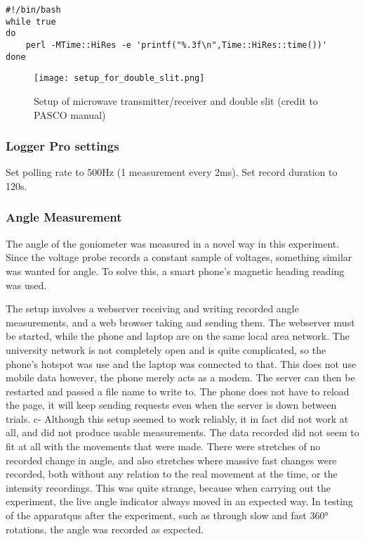 \begin{verbatim}
#!/bin/bash
while true
do
    perl -MTime::HiRes -e 'printf("%.3f\n",Time::HiRes::time())'
done
\end{verbatim}

\begin{figure}[h]
\centering
\texttt{[image: setup\_for\_double\_slit.png]}
\caption{Setup of microwave transmitter/receiver and double slit (credit to PASCO manual)}

\label{fig:goniometer_and_microwaves}
\end{figure}

\subsubsection*{Logger Pro settings}
Set polling rate to 500Hz (1 measurement every 2ms). Set record duration to 120s.

\subsubsection*{Angle Measurement}

The angle of the goniometer was measured in a novel way in this experiment. Since the voltage probe records a constant sample of voltages, something similar was wanted for angle. To solve this, a smart phone's magnetic heading reading was used.

The setup involves a webserver receiving and writing recorded angle measurements, and a web browser taking and sending them. The webserver must be started, while the phone and laptop are on the same local area network. The university network is not completely open and is quite complicated, so the phone's hotspot was use and the laptop was connected to that. This does not use mobile data however, the phone merely acts as a modem. The server can then be restarted and passed a file name to write to. The phone does not have to reload the page, it will keep sending requests even when the server is down between trials. c-
Although this setup seemed to work reliably, it in fact did not work at all, and did not produce usable measurements. The data recorded did not seem to fit at all with the movements that were made. There were stretches of no recorded change in angle, and also stretches where massive fast changes were recorded, both without any relation to the real movement at the time, or the intensity recordings. This was quite strange, because when carrying out the experiment, the live angle indicator always moved in an expected way. In testing of the apparatqus after the experiment, such as through slow and fast 360° rotations, the angle was recorded as expected.

